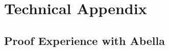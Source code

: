 

\cleardoublepage


\part{Technical Appendix}

\appendix

\chapter{Proof Experience with Abella}


